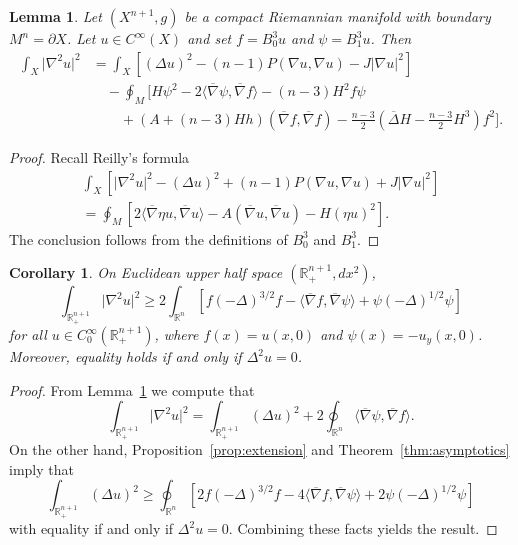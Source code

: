 \documentclass{amsart}
\newtheorem{lem}[thm]{Lemma}
\newtheorem{cor}[thm]{Corollary}
\theoremstyle{definition}
\theoremstyle{remark}
\numberwithin{equation}{section}
\begin{document}
\begin{lem}
 \label{lem:reilly}
 Let $(X^{n+1},g)$ be a compact Riemannian manifold with boundary $M^n=\partial X$.  Let $u\in C^\infty(X)$ and set $f=B_0^3u$ and $\psi=B_1^3u$.  Then
 \begin{align*}
  \int_X {\lvert}\nabla^2u{\rvert}^2 & = \int_X \left[ \left(\Delta u\right)^2 - (n-1)P(\nabla u,\nabla u) - J{\lvert}\nabla u{\rvert}^2 \right] \\
  & \quad - \oint_M \biggl[ H\psi^2 - 2{\langle}{\overline{\nabla}}\psi,{\overline{\nabla}} f{\rangle} - (n-3)H^2f\psi \\
   & \qquad + \left(A+(n-3)Hh\right)({\overline{\nabla}} f,{\overline{\nabla}} f) - \frac{n-3}{2}\left({\overline{\Delta}} H - \frac{n-3}{2}H^3\right)f^2 \biggr] .
 \end{align*}
\end{lem}

\begin{proof}
 Recall Reilly's formula~\cite{Reilly1977}
 \begin{multline*}
  \int_X \left[ {\lvert}\nabla^2u{\rvert}^2 - \left(\Delta u\right)^2 + (n-1)P(\nabla u,\nabla u) + J{\lvert}\nabla u{\rvert}^2 \right] \\ = \oint_M \left[ 2{\langle}{\overline{\nabla}}\eta u,{\overline{\nabla}} u{\rangle} - A({\overline{\nabla}} u,{\overline{\nabla}} u) - H(\eta u)^2 \right] .
 \end{multline*}
 The conclusion follows from the definitions of $B_0^3$ and $B_1^3$.
\end{proof}

\begin{cor}
 \label{cor:trace}
 On Euclidean upper half space $({\mathbb{R}}_+^{n+1},dx^2)$,
 \[ \int_{{\mathbb{R}}_+^{n+1}} {\lvert}\nabla^2u{\rvert}^2 \geq 2\int_{{\mathbb{R}}^n} \left[ f(-\Delta)^{3/2}f - {\langle}{\overline{\nabla}} f,{\overline{\nabla}}\psi{\rangle} + \psi(-\Delta)^{1/2}\psi \right] \]
 for all $u\in C_0^\infty({\mathbb{R}}_+^{n+1})$, where $f(x)=u(x,0)$ and $\psi(x)=-u_y(x,0)$.  Moreover, equality holds if and only if $\Delta^2u=0$.
\end{cor}

\begin{proof}
 From Lemma~\ref{lem:reilly} we compute that
 \[ \int_{{\mathbb{R}}_+^{n+1}}{\lvert}\nabla^2u{\rvert}^2 = \int_{{\mathbb{R}}_+^{n+1}} (\Delta u)^2 + 2\oint_{{\mathbb{R}}^n}{\langle}{\overline{\nabla}}\psi,{\overline{\nabla}} f{\rangle} . \]
 On the other hand, Proposition~\ref{prop:extension} and Theorem~\ref{thm:asymptotics} imply that
 \begin{equation}
  \label{eqn:almost_trace}
  \int_{{\mathbb{R}}_+^{n+1}} (\Delta u)^2 \geq \oint_{{\mathbb{R}}^n} \left[ 2f(-\Delta)^{3/2}f - 4{\langle}{\overline{\nabla}} f,{\overline{\nabla}}\psi{\rangle} + 2\psi(-\Delta)^{1/2}\psi \right]
 \end{equation}
 with equality if and only if $\Delta^2u=0$.  Combining these facts yields the result.
\end{proof}
\end{document}

